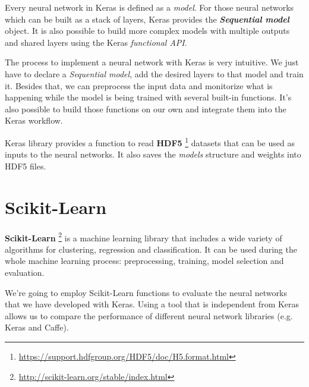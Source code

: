 Every neural network in Keras is defined as a \textit{model}. For those neural networks which can be built as a stack of layers, Keras provides the \textit{\textbf{Sequential model}} object. It is also possible to build more complex models with multiple outputs and shared layers using the Keras \textit{functional API}.

The process to implement a neural network with Keras is very intuitive. We just have to declare a \textit{Sequential model}, add the desired layers to that model and train it. Besides that, we can preprocess the input data and monitorize what is happening while the model is being trained with several built-in functions. It's also possible to build those functions on our own and integrate them into the Keras workflow.

Keras library provides a function to read \textbf{HDF5} \footnote{\url{https://support.hdfgroup.org/HDF5/doc/H5.format.html}} datasets that can be used as inputs to the neural networks. It also saves the \textit{models} structure and weights into HDF5 files.

\section{Scikit-Learn}
\textbf{Scikit-Learn} \footnote{\url {http://scikit-learn.org/stable/index.html}} is a machine learning library that includes a wide variety of algorithms for clustering, regression and classification. It can be used during the whole machine learning process: preprocessing, training, model selection and evaluation.

We're going to employ Scikit-Learn functions to evaluate the neural networks that we have developed with Keras. Using a tool that is independent from Keras allows us to compare the performance of different neural network libraries (e.g. Keras and Caffe).

